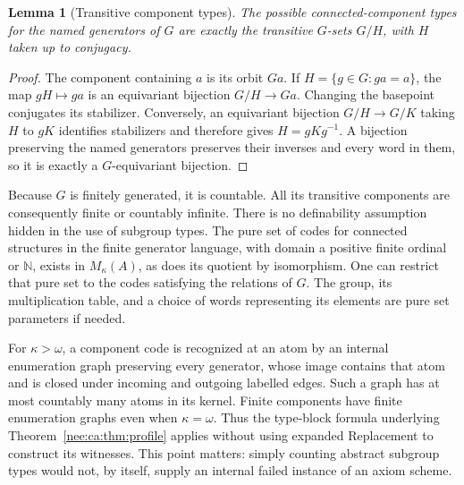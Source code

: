 \documentclass[11pt,letterpaper]{article}
\numberwithin{equation}{section}
\theoremstyle{plain}
\newtheorem{lemma}[lemma]{Lemma}
\theoremstyle{definition}
\theoremstyle{remark}
\newcommand{\Mk}{M_\kappa(A)}
\newcommand{\NN}{\mathbb N}
\begin{document}
\begin{lemma}[Transitive component types]\label{nee:ca:grp:types}
The possible connected-component types for the named generators of $G$
are exactly the transitive $G$-sets $G/H$, with $H$ taken up to conjugacy.
\end{lemma}
\begin{proof}
The component containing $a$ is its orbit $Ga$.  If
$H=\{g\in G:ga=a\}$, the map $gH\mapsto ga$ is an equivariant bijection
$G/H\to Ga$.  Changing the basepoint conjugates its stabilizer.
Conversely, an equivariant bijection $G/H\to G/K$ taking $H$ to $gK$
identifies stabilizers and therefore gives $H=gKg^{-1}$.  A bijection
preserving the named generators preserves their inverses and every word
in them, so it is exactly a $G$-equivariant bijection.
\end{proof}

Because $G$ is finitely generated, it is countable.  All its transitive
components are consequently finite or countably infinite.  There is no
definability assumption hidden in the use of subgroup types.  The pure set
of codes for connected structures in the finite generator language, with
domain a positive finite ordinal or $\NN$, exists in $\Mk$, as does its
quotient by isomorphism.  One can restrict that pure set to the codes
satisfying the relations of $G$.  The group, its multiplication table, and
a choice of words representing its elements are pure set parameters if
needed.

For $\kappa>\omega$, a component code is recognized at an atom by an
internal enumeration graph preserving every generator, whose image
contains that atom and is closed under incoming and outgoing labelled
edges.  Such a graph has at most countably many atoms in its kernel.
Finite components have finite enumeration graphs even when $\kappa=\omega$.
Thus the type-block formula underlying Theorem~\ref{nee:ca:thm:profile} applies
without using expanded Replacement to construct its witnesses.  This
point matters: simply counting abstract subgroup types would not, by
itself, supply an internal failed instance of an axiom scheme.
\end{document}
